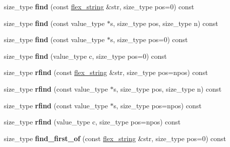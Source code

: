 \begin{DoxyCompactItemize}
\item 
\hypertarget{classflex__string_ae78df4c283746d918fcf89eb9bbc3b64}{}size\+\_\+type {\bfseries find} (const \hyperlink{classflex__string}{flex\+\_\+string} \&str, size\+\_\+type pos=0) const \label{classflex__string_ae78df4c283746d918fcf89eb9bbc3b64}

\item 
\hypertarget{classflex__string_a16bec2f60f34f9ed5167c37248d57b43}{}size\+\_\+type {\bfseries find} (const value\+\_\+type $\ast$s, size\+\_\+type pos, size\+\_\+type n) const \label{classflex__string_a16bec2f60f34f9ed5167c37248d57b43}

\item 
\hypertarget{classflex__string_af2cf5fbd2399ac3f23b7524f3d1a6377}{}size\+\_\+type {\bfseries find} (const value\+\_\+type $\ast$s, size\+\_\+type pos=0) const \label{classflex__string_af2cf5fbd2399ac3f23b7524f3d1a6377}

\item 
\hypertarget{classflex__string_aeab64396cfccee77ea9e8efb8a652ad0}{}size\+\_\+type {\bfseries find} (value\+\_\+type c, size\+\_\+type pos=0) const \label{classflex__string_aeab64396cfccee77ea9e8efb8a652ad0}

\item 
\hypertarget{classflex__string_a262930d7f7f596eeb637b9dad077e43f}{}size\+\_\+type {\bfseries rfind} (const \hyperlink{classflex__string}{flex\+\_\+string} \&str, size\+\_\+type pos=npos) const \label{classflex__string_a262930d7f7f596eeb637b9dad077e43f}

\item 
\hypertarget{classflex__string_a6d6c0922b9068957e6280da37fcf9639}{}size\+\_\+type {\bfseries rfind} (const value\+\_\+type $\ast$s, size\+\_\+type pos, size\+\_\+type n) const \label{classflex__string_a6d6c0922b9068957e6280da37fcf9639}

\item 
\hypertarget{classflex__string_a2c70e16921b7f35a0d1bb6c7e401510c}{}size\+\_\+type {\bfseries rfind} (const value\+\_\+type $\ast$s, size\+\_\+type pos=npos) const \label{classflex__string_a2c70e16921b7f35a0d1bb6c7e401510c}

\item 
\hypertarget{classflex__string_a6fe09b5fe4d70f5acb2b88683dd62dfa}{}size\+\_\+type {\bfseries rfind} (value\+\_\+type c, size\+\_\+type pos=npos) const \label{classflex__string_a6fe09b5fe4d70f5acb2b88683dd62dfa}

\item 
\hypertarget{classflex__string_a0b064f873745bda5d40950e3f46eff0d}{}size\+\_\+type {\bfseries find\+\_\+first\+\_\+of} (const \hyperlink{classflex__string}{flex\+\_\+string} \&str, size\+\_\+type pos=0) const \label{classflex__string_a0b064f873745bda5d40950e3f46eff0d}


\end{DoxyCompactItemize}
